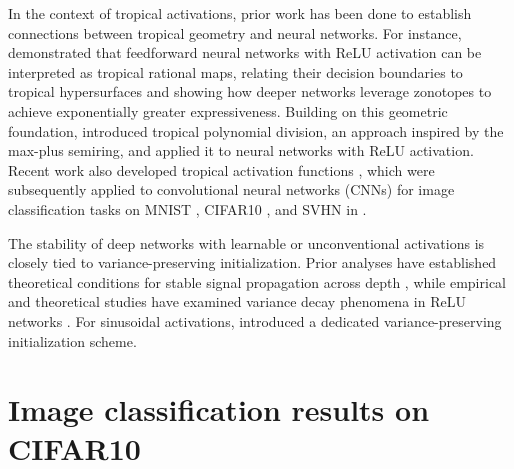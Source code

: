 \documentclass{article} %
\theoremstyle{plain}
\theoremstyle{definition}
\theoremstyle{remark}
\begin{document}
In the context of tropical activations, prior work has been done to establish connections between tropical geometry and neural networks. For instance, \cite{zhang2018tropical} demonstrated that feedforward neural networks with ReLU activation can be interpreted as tropical rational maps, relating their decision boundaries to tropical hypersurfaces and showing how deeper networks leverage zonotopes to achieve exponentially greater expressiveness. Building on this geometric foundation, \cite{smyrnis2019tropical} introduced tropical polynomial division, an approach inspired by the max-plus semiring, and applied it to neural networks with ReLU activation. Recent work also developed tropical activation functions  \cite{yoshida2024tropical}, which were subsequently applied to convolutional neural networks (CNNs) for image classification tasks on MNIST \cite{lecun1998mnist}, CIFAR10 \cite{krizhevsky2009learning}, and SVHN \cite{netzer2011reading} in \cite{pasque2026adversarially}.


The stability of deep networks with learnable or unconventional activations is closely tied to variance-preserving initialization. Prior analyses have established theoretical conditions for stable signal propagation across depth \cite{hanin2018start}, while empirical and theoretical studies have examined variance decay phenomena in ReLU networks \cite{luther2019sample}. For sinusoidal activations, \citet{passalis2019variance} introduced a dedicated variance-preserving initialization scheme.

\section{Image classification results on CIFAR10}
\end{document}
